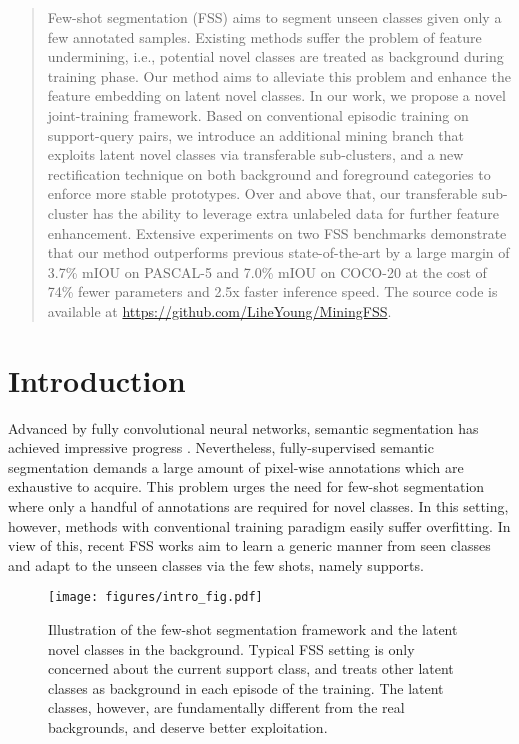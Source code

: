 \documentclass[10pt,twocolumn,letterpaper]{article}
\begin{document}
\begin{abstract}
    Few-shot segmentation (FSS) aims to segment unseen classes given only a few annotated samples. Existing methods suffer the problem of feature undermining, i.e., potential novel classes are treated as background during training phase. Our method aims to alleviate this problem and enhance the feature embedding on latent novel classes. In our work, we propose a novel joint-training framework. Based on conventional episodic training on support-query pairs, we introduce an additional mining branch that exploits latent novel classes via transferable sub-clusters, and a new rectification technique on both background and foreground categories to enforce more stable prototypes. Over and above that, our transferable sub-cluster has the ability to leverage extra unlabeled data for further feature enhancement. Extensive experiments on two FSS benchmarks demonstrate that our method outperforms previous state-of-the-art by a large margin of 3.7\% mIOU on PASCAL-5 and 7.0\% mIOU on COCO-20 at the cost of 74\% fewer parameters and 2.5x faster inference speed. The source code is available at \url{https://github.com/LiheYoung/MiningFSS}.
\end{abstract} \section{Introduction}

Advanced by fully convolutional neural networks, semantic segmentation has achieved impressive progress \cite{long2015fully, zhao2017pyramid, chen2018encoder, li2019expectation, yuan2019object}. Nevertheless, fully-supervised semantic segmentation demands a large amount of pixel-wise annotations which are exhaustive to acquire. This problem urges the need for few-shot segmentation where only a handful of annotations are required for novel classes. In this setting, however, methods with conventional training paradigm \cite{long2015fully} easily suffer overfitting. In view of this, recent FSS works aim to learn a generic manner from seen classes and adapt to the unseen classes via the few shots, namely supports.

\begin{figure}
    \centering
    \texttt{[image: figures/intro\_fig.pdf]}
    \caption{Illustration of the few-shot segmentation framework and the latent novel classes in the background. Typical FSS setting is only concerned about the current support class, and treats other latent classes as background in each episode of the training. The latent classes, however, are fundamentally different from the real backgrounds, and deserve better exploitation.
    }
    \label{intro_fig}
    \vspace{-0.3cm}
\end{figure}
\end{document}
